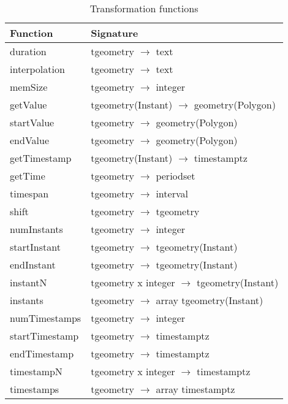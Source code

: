 \label{appendix:complete_funct_tables}

\begin{table}[htbp]
\begin{subtable}{1\textwidth}
\centering
    \begin{tabularx}{\textwidth}{|l|X|}
        \hline
        \textbf{Function}   & \textbf{Signature} \\ 
        \hline
        duration            & tgeometry $\rightarrow$ text\\
        \hline
        interpolation       & tgeometry $\rightarrow$ text\\
        \hline
        memSize             & tgeometry $\rightarrow$ integer \\
        \hline
        getValue            & tgeometry(Instant) $\rightarrow$ geometry(Polygon) \\
        \hline
        startValue          & tgeometry $\rightarrow$ geometry(Polygon) \\
        \hline
        endValue            & tgeometry $\rightarrow$ geometry(Polygon) \\
        \hline
        getTimestamp        & tgeometry(Instant) $\rightarrow$ timestamptz \\
        \hline
        getTime             & tgeometry $\rightarrow$ periodset \\
        \hline
        timespan            & tgeometry $\rightarrow$ interval \\
        \hline
        shift               & tgeometry $\rightarrow$ tgeometry \\
        \hline
        numInstants         & tgeometry $\rightarrow$ integer \\
        \hline
        startInstant        & tgeometry $\rightarrow$ tgeometry(Instant) \\
        \hline
        endInstant          & tgeometry $\rightarrow$ tgeometry(Instant) \\
        \hline
        instantN            & tgeometry x integer $\rightarrow$ tgeometry(Instant) \\
        \hline
        instants            & tgeometry $\rightarrow$ array tgeometry(Instant) \\
        \hline
        numTimestamps       & tgeometry $\rightarrow$ integer \\
        \hline
        startTimestamp      & tgeometry $\rightarrow$ timestamptz \\
        \hline
        endTimestamp        & tgeometry $\rightarrow$ timestamptz \\
        \hline
        timestampN          & tgeometry x integer $\rightarrow$ timestamptz \\
        \hline
        timestamps          & tgeometry $\rightarrow$ array timestamptz \\
        \hline
        \end{tabularx}
\end{subtable}
\caption{Transformation functions}
\label{table:transformation_funcs_complete}
\end{table}

